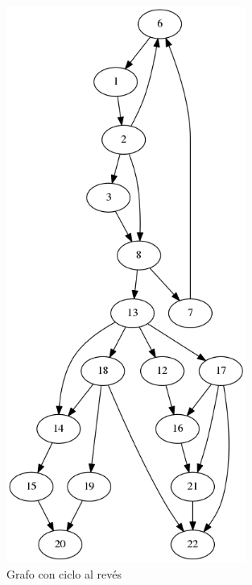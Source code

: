 \begin{figure}[H]
	\centering
	\includegraphics[width=0.7\textwidth]{img/links_a_ciclo_al_reves_25.png}
	\caption{Grafo con ciclo al rev\'es}
	\label{fig: Grafo con ciclo al rev\'es}
\end{figure}

